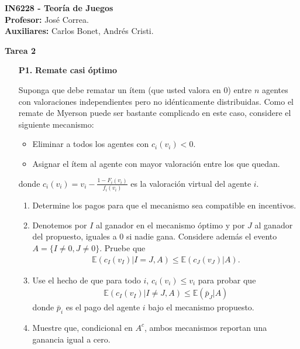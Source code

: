 \documentclass[11pt, spanish]{article}
\theoremstyle{plain}
\newcommand{\E}{\mathbb{E}}
\begin{document}

\begin{flushleft}
  \textbf{IN6228 - Teor\'ia de Juegos}
  \\\textbf{Profesor:} Jos\'e Correa.
  \\\textbf{Auxiliares:} Carlos Bonet, Andr\'es Cristi.
\end{flushleft}


\begin{center}
  \Large{\textbf{Tarea 2}}
\end{center}




\begin{itemize}
  \item[\textbf{P1.}] \textbf{Remate casi óptimo}

Suponga que debe rematar un ítem (que usted valora
en 0) entre $n$ agentes
con valoraciones independientes pero no idénticamente
distribuidas. Como el remate
de Myerson puede ser bastante complicado en este caso, considere
el siguiente mecanismo:
\begin{itemize}
    \item Eliminar a todos los agentes con $c_i(v_i)<0$.
    \item Asignar el ítem al agente con mayor valoración entre los que quedan.
\end{itemize}
donde $c_i(v_i)= v_i - \frac{1-F_i(v_i)}{f_i(v_i)}$ es la valoración virtual del agente $i$.
\begin{enumerate}
    \item Determine los pagos para que el mecanismo sea compatible en incentivos.
    \item Denotemos por $I$ al ganador en el mecanismo
    óptimo y por $J$ al ganador del propuesto, iguales a $0$ si
    nadie gana. Considere además el evento 
    $A= \{ I\neq 0, J\neq 0\}$. Pruebe que
    \begin{align}
        \E(c_I(v_I) | I=J, A) \leq \E(c_J(v_J)|A).
    \end{align}
    
    \item Use el hecho de que para todo $i$,
    $c_i(v_i) \leq v_i$ para probar que 
    \begin{align}
        \E( c_I(v_I) | I\neq J, A) \leq \E(\bar{p}_J | A)
    \end{align}
    donde $\bar{p}_i$ es el pago del agente $i$
    bajo el mecanismo propuesto.
    \item Muestre que, condicional en $A^c$, ambos
    mecanismos reportan una ganancia igual a cero.
    

\end{enumerate}
\end{itemize}
\end{document}
